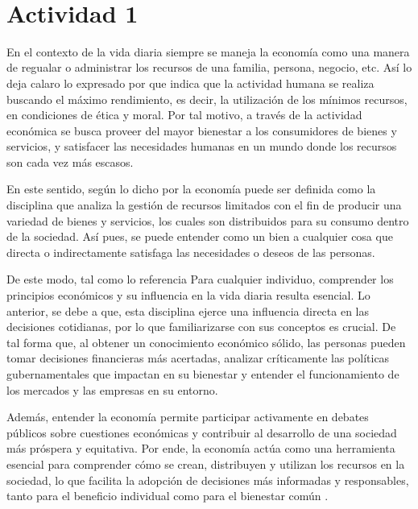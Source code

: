 
\justify
\fontsize{12pt}{14}\
\setlength{\parindent}{0cm}

\newpage
\section{Actividad 1}
\normalsize En el contexto de la vida diaria siempre se maneja la economía como una manera de regualar o administrar los recursos de una familia, persona, negocio, etc. Así lo deja calaro lo expresado por \cite{pereira2011} que indica que la actividad humana se realiza buscando el máximo rendimiento, es decir, la utilización de los mínimos recursos, en condiciones de ética y moral. Por tal motivo, a través de la actividad económica se busca proveer del mayor bienestar a los consumidores de bienes y servicios, y satisfacer las necesidades humanas en un mundo donde los recursos son cada vez más escasos.

\normalsize En este sentido, según lo dicho por \cite{llorca2016} la economía puede ser definida como la disciplina que analiza la gestión de recursos limitados con el fin de producir una variedad de bienes y servicios, los cuales son distribuidos para su consumo dentro de la sociedad. Así pues, se puede entender como un bien a cualquier cosa que directa o indirectamente satisfaga las necesidades o deseos de las personas.

\normalsize De este modo, tal como lo referencia \cite{euroinnova2023} Para cualquier individuo, comprender los principios económicos y su influencia en la vida diaria resulta esencial. Lo anterior, se debe a que, esta disciplina ejerce una influencia directa en las decisiones cotidianas, por lo que familiarizarse con sus conceptos es crucial. De tal forma que, al obtener un conocimiento económico sólido, las personas pueden tomar decisiones financieras más acertadas, analizar críticamente las políticas gubernamentales que impactan en su bienestar y entender el funcionamiento de los mercados y las empresas en su entorno.

\normalsize Además, entender la economía permite participar activamente en debates públicos sobre cuestiones económicas y contribuir al desarrollo de una sociedad más próspera y equitativa. Por ende, la economía actúa como una herramienta esencial para comprender cómo se crean, distribuyen y utilizan los recursos en la sociedad, lo que facilita la adopción de decisiones más informadas y responsables, tanto para el beneficio individual como para el bienestar común \parencite{euroinnova2023}.

